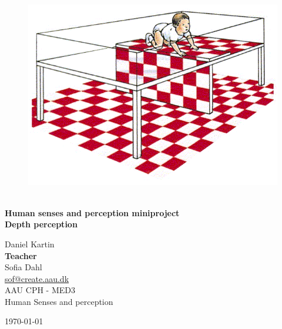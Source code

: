\begin{titlepage}
			
\addtolength{\voffset}{2cm}

\begin{figure}[H]
\centering
\vspace{2cm}	%
\includegraphics[width=0.99\linewidth]{figure/Frontpage/frontpage.png}
\end{figure}

\mbox{}
\vfill
\renewcommand{\familydefault}{\sfdefault} \normalfont %
\HRule\\[0.2cm]
\textbf{{\small Human senses and perception miniproject\\ \Huge Depth perception}}\\
\HRule\medskip{}
\begin{multicols}{2}
{\Large Daniel Kartin\columnbreak}\\
\setlength{\parskip}{2.4cm}
\Large{\textbf{Teacher}\\Sofia Dahl\\\href{mailto:sof@create.aau.dk}{sof@create.aau.dk}}
\\\small AAU CPH - 
MED3 \\
Human Senses and perception\\
\end{multicols}
\today
\renewcommand{\familydefault}{\rmdefault} \normalfont %
\end{titlepage}


